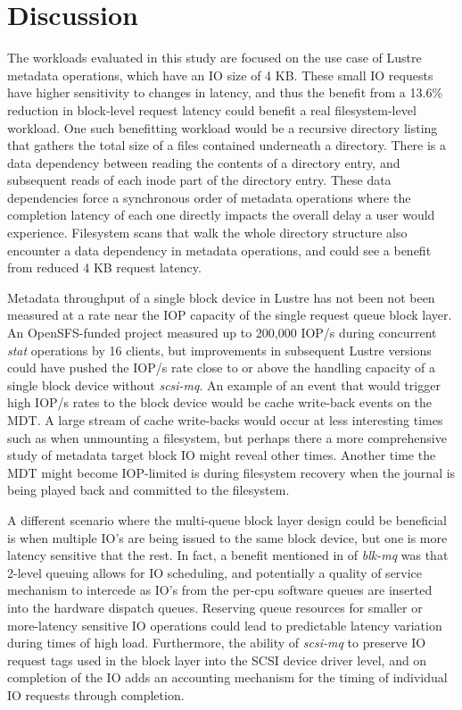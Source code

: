 \documentclass[conference]{IEEEtran}
\begin{document}
\section{Discussion}
\label{sec:discuss}

The workloads evaluated in this study are focused on the use case of Lustre metadata operations, which have an IO size of 4 KB. These small
IO requests have higher sensitivity to changes in latency, and thus the benefit from a 13.6\% reduction in block-level request latency
could benefit a real filesystem-level workload. One such benefitting workload would be a recursive directory listing that gathers the total size of a files contained
underneath a directory. There is a data dependency between reading the contents of a directory entry, and subsequent reads of each inode
part of the directory entry. These data dependencies force a synchronous order of metadata operations where the completion latency
of each one directly impacts the overall delay a user would experience. Filesystem scans
that walk the whole directory structure also encounter a data dependency in metadata operations, and could see a benefit from reduced 4 KB
request latency.

Metadata throughput of a single block device in Lustre has not been not been measured at a rate near the IOP
capacity of the single request queue block layer. An OpenSFS-funded project \cite{www:mdssmp} measured
up to 200,000 IOP/s during concurrent \emph{stat} operations by 16 clients, but improvements in subsequent Lustre
versions could have pushed the IOP/s rate close to or above the handling capacity of a single block device without
\emph{scsi-mq}. An example of an event that would trigger high IOP/s rates to the block device would be cache
write-back events on the MDT.  A large stream of cache write-backs would occur at less interesting times such as 
when unmounting a filesystem, but perhaps there a more comprehensive study of metadata target block IO might
reveal other times. Another time the MDT might become IOP-limited is during filesystem recovery when the journal is
being played back and committed to the filesystem.

A different scenario where the multi-queue block layer design could be beneficial is when multiple IO's are being issued to
the same block device, but one is more latency sensitive that the rest. In fact,
a benefit mentioned in \cite{bjorling13} of \emph{blk-mq} was that 2-level queuing allows for IO scheduling, and 
potentially a quality of service mechanism to intercede as IO's from the per-cpu software queues are inserted into
the hardware dispatch queues. Reserving queue resources for smaller or more-latency sensitive IO operations
could lead to predictable latency variation during times of high load. Furthermore, the ability of
\emph{scsi-mq} to preserve IO request tags used in the block layer into the SCSI device driver level, and 
on completion of the IO adds an accounting mechanism for the timing of individual IO requests through completion.
\end{document}
